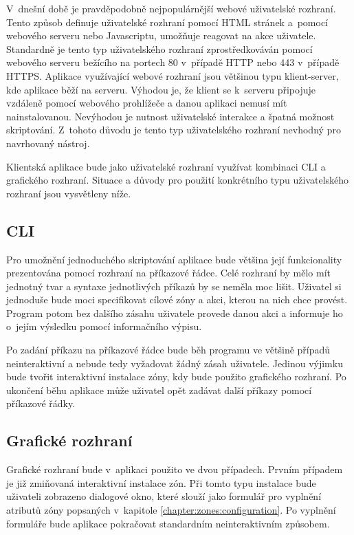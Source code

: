 V~dnešní době je pravděpodobně nejpopulárnější webové uživatelské rozhraní. Tento způsob definuje uživatelské rozhraní pomocí
HTML stránek a~pomocí webového serveru nebo Javascriptu, umožňuje reagovat na akce uživatele. Standardně je tento typ uživatelského
rozhraní zprostředkováván pomocí webového serveru bežícího na portech 80 v~případě HTTP nebo 443 v~případě HTTPS. Aplikace
využívající webové rozhraní jsou většinou typu klient-server, kde aplikace běží na serveru. Výhodou je, že klient se
k~serveru připojuje vzdáleně pomocí webového prohlížeče a danou aplikaci nemusí mít nainstalovanou. Nevýhodou je nutnost
uživatelské interakce a špatná možnost skriptování. Z~tohoto důvodu je tento typ uživatelského rozhraní nevhodný pro navrhovaný
nástroj.

Klientská aplikace bude jako uživatelské rozhraní využívat kombinaci CLI a grafického rozhraní. Situace a důvody pro použití
konkrétního typu uživatelského rozhraní jsou vysvětleny níže.
\subsection{CLI}
\label{chapter:design:ui:cli}
Pro umožnění jednoduchého skriptování aplikace bude většina její funkcionality prezentována pomocí rozhraní na příkazové
řádce. Celé rozhraní by mělo mít jednotný tvar a syntaxe jednotlivých příkazů by se neměla moc lišit. Uživatel si jednoduše
bude moci specifikovat cílové zóny a akci, kterou na nich chce provést. Program potom bez dalšího zásahu uživatele provede
danou akci a informuje ho o~jejím výsledku pomocí informačního výpisu.

Po zadání příkazu na příkazové řádce bude běh programu ve většině případů neinteraktivní a nebude tedy vyžadovat žádný 
zásah uživatele. Jedinou výjimku bude tvořit interaktivní instalace zóny, kdy bude použito grafického rozhraní. Po ukončení
běhu aplikace může uživatel opět zadávat další příkazy pomocí příkazové řádky.
\subsection{Grafické rozhraní}
\label{chapter:design:ui:gui}
Grafické rozhraní bude v~aplikaci použito ve dvou případech. Prvním případem je již zmiňovaná interaktivní instalace zón. Při
tomto typu instalace bude uživateli zobrazeno dialogové okno, které slouží jako formulář pro vyplnění atributů zóny popsaných
v~kapitole \ref{chapter:zones:configuration}. Po vyplnění formuláře bude aplikace pokračovat standardním neinteraktivním způsobem.

